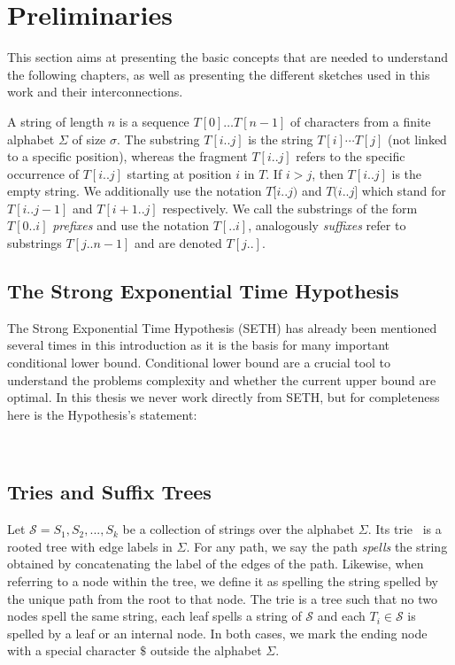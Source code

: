 \section{Preliminaries}\label{sec:prelim}

This section aims at presenting the basic concepts that are needed to understand the following chapters, as well as presenting the different sketches used in this work and their interconnections.

\noindent A string of length $n$ is a sequence $T[0] \dots T[n-1]$ of characters from a finite alphabet $\Sigma$ of size $\sigma$. The substring $T[i..j]$ is the string $T[i] \cdots T[j]$ (not linked to a specific position), whereas the fragment $T[i..j]$ refers to the specific occurrence of $T[i..j]$ starting at position $i$ in $T$. If $i > j$, then $T[i..j]$ is the empty string. We additionally use the notation $T[i..j)$ and $T(i..j]$ which stand for $T[i..j-1]$ and $T[i+1..j]$ respectively. We call the substrings of the form $T[0..i]$ \emph{prefixes}  and use the notation $T[..i]$, analogously \emph{suffixes} refer to substrings $T[j..n-1]$ and are denoted $T[j..]$.

\subsection{The Strong Exponential Time Hypothesis}

The Strong Exponential Time Hypothesis (SETH) has already been mentioned several times in this introduction as it is the basis for many important conditional lower bound. Conditional lower bound are a crucial tool to understand the problems complexity and whether the current upper bound are optimal. In this thesis we never work directly from SETH, but for completeness here is the Hypothesis's statement:

\\

\subsection{Tries and Suffix Trees}\label{sec:prelim:tries}
Let $\mathcal{S} = {S_1,S_2, ..., S_k}$ be a collection of strings over the alphabet $\Sigma$. Its trie~\cite{thue1912gegenseitige,de1959file,fredkin1960trie} is a rooted tree with edge labels in $\Sigma$.
For any path, we say the path \emph{spells} the string obtained by concatenating the label of the edges of the path.
Likewise, when referring to a node within the tree, we define it as spelling the string spelled by the unique path from the root to that node.
The trie is a tree such that no two nodes spell the same string, each leaf spells a string of $\mathcal{S}$ and each $T_i \in \mathcal{S}$ is spelled by a leaf or an internal node. In both cases, we mark the ending node with a special character $\$$ outside the alphabet $\Sigma$.


